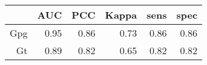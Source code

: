 \begin{table}[ht]
\centering
\begin{tabular}{rrrrrr}
  \toprule
 & AUC & PCC & Kappa & sens & spec \\ 
  \midrule
Gpg & 0.95 & 0.86 & 0.73 & 0.86 & 0.86 \\ 
  Gt & 0.89 & 0.82 & 0.65 & 0.82 & 0.82 \\ 
   \bottomrule
\end{tabular}
\end{table}
